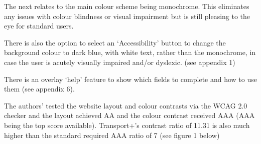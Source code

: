 \documentclass{ueacmpstyle}
\begin{document}
{{The next relates to the main colour scheme being monochrome. This eliminates any issues with colour blindness or visual impairment but is still pleasing to the eye for standard users.

There is also the option to select an `Accessibility' button to change the background colour to dark blue, with white text, rather than the monochrome, in case the user is acutely visually impaired and/or dyslexic. (see appendix 1) 

There is an overlay `help' feature to show which fields to complete and how to use them (see appendix 6).

The authors' tested the website layout and colour contrasts via the WCAG 2.0 checker and the layout achieved AA and the colour contrast received AAA (AAA being the top score available). Transport+'s contrast ratio of 11.31 is also much higher than the standard required AAA ratio of 7 (see figure 1 below)

}}
\end{document}
